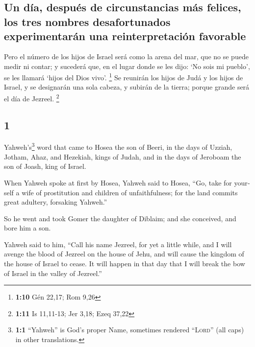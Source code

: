 \begin{paracol}{2}
\hypertarget{un-duxeda-despuuxe9s-de-circunstancias-muxe1s-felices-los-tres-nombres-desafortunados-experimentaruxe1n-una-reinterpretaciuxf3n-favorable}{%
\subsection{Un día, después de circunstancias más felices, los tres
nombres desafortunados experimentarán una reinterpretación
favorable}\label{un-duxeda-despuuxe9s-de-circunstancias-muxe1s-felices-los-tres-nombres-desafortunados-experimentaruxe1n-una-reinterpretaciuxf3n-favorable}}

 Pero el número de los hijos de Israel será como la arena
del mar, que no se puede medir ni contar; y sucederá que, en el lugar
donde se les dijo: `No sois mi pueblo', se les llamará `hijos del Dios
vivo'. \footnote{\textbf{1:10} Gén 22,17; Rom 9,26}  Se
reunirán los hijos de Judá y los hijos de Israel, y se designarán una
sola cabeza, y subirán de la tierra; porque grande será el día de
Jezreel. \footnote{\textbf{1:11} Is 11,11-13; Jer 3,18; Ezeq 37,22}

\switchcolumn
\begin{otherlanguage}{english}

\hypertarget{section-1}{%
\section{1}\label{section-1}}

 Yahweh's\footnote{\textbf{1:1} ``Yahweh'' is God's proper
  Name, sometimes rendered ``\textsc{Lord}'' (all caps) in other
  translations.} word that came to Hosea the son of Beeri, in the days
of Uzziah, Jotham, Ahaz, and Hezekiah, kings of Judah, and in the days
of Jeroboam the son of Joash, king of Israel.

 When Yahweh spoke at first by Hosea, Yahweh said to
Hosea, ``Go, take for yourself a wife of prostitution and children of
unfaithfulness; for the land commits great adultery, forsaking Yahweh.''

 So he went and took Gomer the daughter of Diblaim; and
she conceived, and bore him a son.

 Yahweh said to him, ``Call his name Jezreel, for yet a
little while, and I will avenge the blood of Jezreel on the house of
Jehu, and will cause the kingdom of the house of Israel to cease.
 It will happen in that day that I will break the bow of
Israel in the valley of Jezreel.''


\end{otherlanguage}
\end{paracol}
